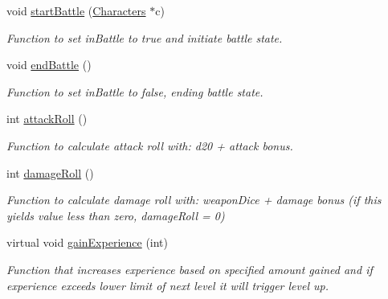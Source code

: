 \begin{DoxyCompactItemize}
void \hyperlink{class_characters_ac7e98c3ef453dad9f68b180438d27a0f}{start\+Battle} (\hyperlink{class_characters}{Characters} $\ast$c)
\begin{DoxyCompactList}\small\item\em Function to set in\+Battle to true and initiate battle state. \end{DoxyCompactList}\item 
\hypertarget{class_characters_a115192e66e8bd958c49093e76208d17b}{}\label{class_characters_a115192e66e8bd958c49093e76208d17b} 
void \hyperlink{class_characters_a115192e66e8bd958c49093e76208d17b}{end\+Battle} ()
\begin{DoxyCompactList}\small\item\em Function to set in\+Battle to false, ending battle state. \end{DoxyCompactList}\item 
\hypertarget{class_characters_a7b8da28aa1fca4191bf181f6f10ddb23}{}\label{class_characters_a7b8da28aa1fca4191bf181f6f10ddb23} 
int \hyperlink{class_characters_a7b8da28aa1fca4191bf181f6f10ddb23}{attack\+Roll} ()
\begin{DoxyCompactList}\small\item\em Function to calculate attack roll with\+: d20 + attack bonus. \end{DoxyCompactList}\item 
\hypertarget{class_characters_acfbeb255a424493efe9224a1d177ea5c}{}\label{class_characters_acfbeb255a424493efe9224a1d177ea5c} 
int \hyperlink{class_characters_acfbeb255a424493efe9224a1d177ea5c}{damage\+Roll} ()
\begin{DoxyCompactList}\small\item\em Function to calculate damage roll with\+: weapon\+Dice + damage bonus (if this yields value less than zero, damage\+Roll = 0) \end{DoxyCompactList}\item 
\hypertarget{class_characters_a77bd85803742621607c58d7c3593d7b0}{}\label{class_characters_a77bd85803742621607c58d7c3593d7b0} 
virtual void \hyperlink{class_characters_a77bd85803742621607c58d7c3593d7b0}{gain\+Experience} (int)
\begin{DoxyCompactList}\small\item\em Function that increases experience based on specified amount gained and if experience exceeds lower limit of next level it will trigger level up. \end{DoxyCompactList}\item 
\hypertarget{class_characters_af3328b1a080cff8bab2af7597f98be6a}{}\label{class_characters_af3328b1a080cff8bab2af7597f98be6a} 

\end{DoxyCompactItemize}
